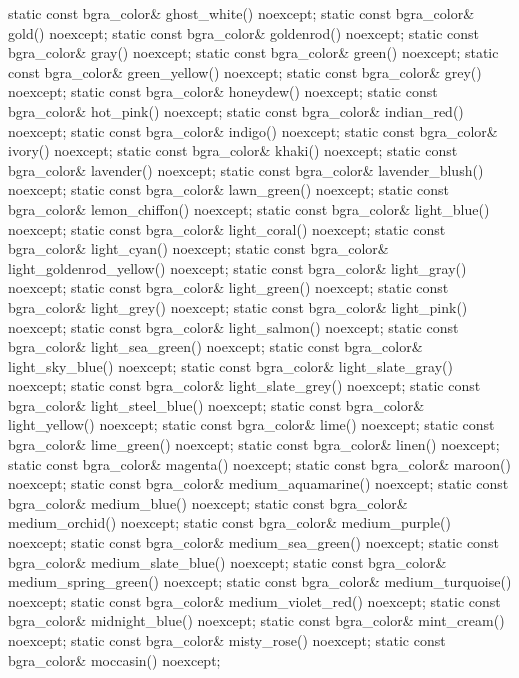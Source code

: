 \begin{codeblock}
{{{{{    static const bgra_color& ghost_white() noexcept;
    static const bgra_color& gold() noexcept;
    static const bgra_color& goldenrod() noexcept;
    static const bgra_color& gray() noexcept;
    static const bgra_color& green() noexcept;
    static const bgra_color& green_yellow() noexcept;
    static const bgra_color& grey() noexcept;
    static const bgra_color& honeydew() noexcept;
    static const bgra_color& hot_pink() noexcept;
    static const bgra_color& indian_red() noexcept;
    static const bgra_color& indigo() noexcept;
    static const bgra_color& ivory() noexcept;
    static const bgra_color& khaki() noexcept;
    static const bgra_color& lavender() noexcept;
    static const bgra_color& lavender_blush() noexcept;
    static const bgra_color& lawn_green() noexcept;
    static const bgra_color& lemon_chiffon() noexcept;
    static const bgra_color& light_blue() noexcept;
    static const bgra_color& light_coral() noexcept;
    static const bgra_color& light_cyan() noexcept;
    static const bgra_color& light_goldenrod_yellow() noexcept;
    static const bgra_color& light_gray() noexcept;
    static const bgra_color& light_green() noexcept;
    static const bgra_color& light_grey() noexcept;
    static const bgra_color& light_pink() noexcept;
    static const bgra_color& light_salmon() noexcept;
    static const bgra_color& light_sea_green() noexcept;
    static const bgra_color& light_sky_blue() noexcept;
    static const bgra_color& light_slate_gray() noexcept;
    static const bgra_color& light_slate_grey() noexcept;
    static const bgra_color& light_steel_blue() noexcept;
    static const bgra_color& light_yellow() noexcept;
    static const bgra_color& lime() noexcept;
    static const bgra_color& lime_green() noexcept;
    static const bgra_color& linen() noexcept;
    static const bgra_color& magenta() noexcept;
    static const bgra_color& maroon() noexcept;
    static const bgra_color& medium_aquamarine() noexcept;
    static const bgra_color& medium_blue() noexcept;
    static const bgra_color& medium_orchid() noexcept;
    static const bgra_color& medium_purple() noexcept;
    static const bgra_color& medium_sea_green() noexcept;
    static const bgra_color& medium_slate_blue() noexcept;
    static const bgra_color& medium_spring_green() noexcept;
    static const bgra_color& medium_turquoise() noexcept;
    static const bgra_color& medium_violet_red() noexcept;
    static const bgra_color& midnight_blue() noexcept;
    static const bgra_color& mint_cream() noexcept;
    static const bgra_color& misty_rose() noexcept;
    static const bgra_color& moccasin() noexcept;
}}}}}
\end{codeblock}
